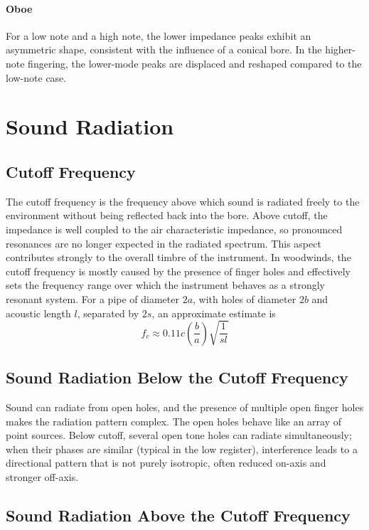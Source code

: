 \paragraph{Oboe} For a low note and a high note, the lower impedance peaks exhibit an asymmetric shape, consistent with the influence of a conical bore. In the higher-note fingering, the lower-mode peaks are displaced and reshaped compared to the low-note case.

\section{Sound Radiation}

\subsection{Cutoff Frequency}

The cutoff frequency is the frequency above which sound is radiated freely to the environment without being reflected back into the bore. Above cutoff, the impedance is well coupled to the air characteristic impedance, so pronounced resonances are no longer expected in the radiated spectrum. This aspect contributes strongly to the overall timbre of the instrument. In woodwinds, the cutoff frequency is mostly caused by the presence of finger holes and effectively sets the frequency range over which the instrument behaves as a strongly resonant system. For a pipe of diameter \( 2a \), with holes of diameter \( 2b \) and acoustic length \( l \), separated by \( 2s \), an approximate estimate is
\[
f_c \approx 0.11c\left(\frac{b}{a}\right)\sqrt{\frac{1}{sl}}
\]

\subsection{Sound Radiation Below the Cutoff Frequency}

Sound can radiate from open holes, and the presence of multiple open finger holes makes the radiation pattern complex. The open holes behave like an array of point sources. Below cutoff, several open tone holes can radiate simultaneously; when their phases are similar (typical in the low register), interference leads to a directional pattern that is not purely isotropic, often reduced on-axis and stronger off-axis.

\subsection{Sound Radiation Above the Cutoff Frequency}

